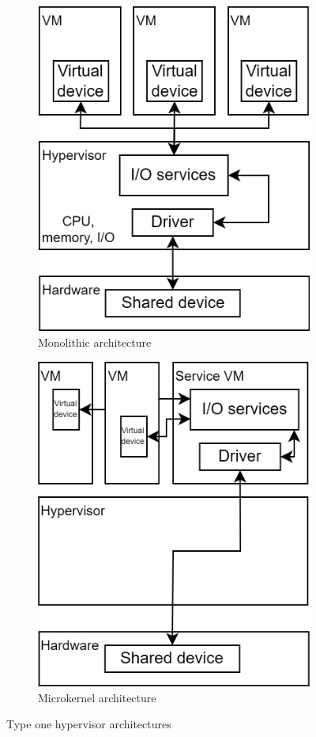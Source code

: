 \begin{figure}[H]
    \centering
    \begin{subfigure}{0.49\textwidth}
        \centering
        \includegraphics[width=0.75\linewidth]{images/mono.png} 
        \caption{Monolithic architecture}
    \end{subfigure}
    \begin{subfigure}{0.49\textwidth}
        \centering
        \includegraphics[width=0.75\linewidth]{images/mic.png}
        \caption{Microkernel architecture}
    \end{subfigure}
    \caption{Type one hypervisor architectures}
\end{figure}

